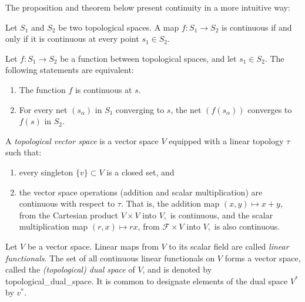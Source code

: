 The proposition and theorem below present continuity in a more intuitive way:
\begin{proposition} \cite[Theorem 2.27]{guide2006infinite}
  Let \( S_1 \) and \( S_2 \) be two topological spaces. A map \( f : S_1 \to S_2 \) is continuous if and only if it is continuous at every point \( s_1 \in S_2 \).
\end{proposition}

\begin{theorem} \cite[Theorem 2.28]{guide2006infinite} \label{def:continuidade_top}
  Let $f \colon S_1 \to S_2$ be a function between topological spaces, and let $s_1 \in S_2$. The following statements are equivalent:
\begin{enumerate}
    \item The function $f$ is continuous at $s$.
    \item For every net $(s_\alpha)$ in $S_1$ converging to $s$, the net $(f(s_\alpha))$ converges to $f(s)$ in $S_2$.
\end{enumerate}
\end{theorem}




\begin{definition}
A \emph{topological vector space} is a vector space \( V \) equipped with a linear topology \( \tau \) such that:
\begin{enumerate}
    \item every singleton \( \{v\} \subset V \) is a closed set, and
    \item the vector space operations (addition and scalar multiplication) are continuous with respect to \( \tau \).  That is, the addition map \( (x, y) \mapsto x + y \), from the Cartesian product \( V \times V \) into \( V, \) is continuous, and the scalar multiplication map \( (r, x) \mapsto r x \), from \( \mathcal{F} \times V \) into \( V, \) is also continuous.
\end{enumerate}

\end{definition}

\begin{definition}
  Let $V$ be a vector space. 
  Linear maps from $V$ to its scalar field are called \emph{linear functionals}. The set of all continuous linear functionals on $V$ forms a vector space, called the \emph{(topological) dual space} of $ V $, and is denoted by  \gls{topological_dual_space}. It is common to designate elements of the dual space  $V^*$  by \( v^* \).  %
\end{definition}

